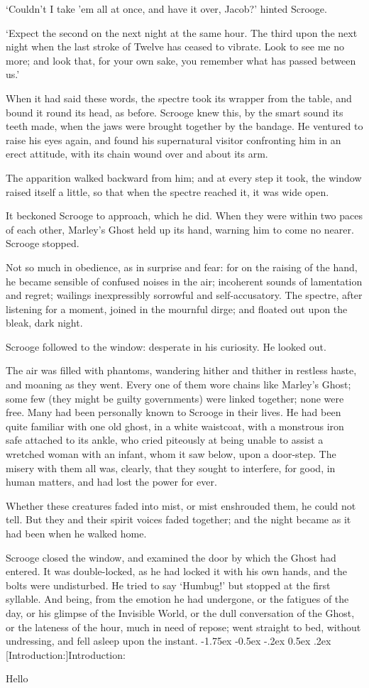 \documentclass[11pt,twoside]{article}\makeatletter
\makeatletter
\renewcommand\section{\@startsection {section}{1}{\z@}%
     {-1.75ex \@plus -0.5ex \@minus -.2ex}%
     {0.5ex \@plus .2ex}%
     {\reset@font\Large\bfseries\sffamily}}
\renewcommand\subsection{\@startsection{subsection}{2}{\z@}%
     {-1.75ex\@plus -0.5ex \@minus- .2ex}%
     {0.5ex \@plus .2ex}%
     {\reset@font\Large\sffamily}}
\def\DivII{\subsection}
\def\DivII{\section}
\makeatother
\begin{document}
‘Couldn't I take 'em all at once, and have it over, Jacob?’ hinted Scrooge.  \par
‘Expect the second on the next night at the same hour. The third upon the next night when the last stroke of Twelve has ceased to vibrate.  Look to see me no more; and look that, for your own sake, you remember what has passed between us.’\par
When it had said these words, the spectre took its wrapper from the table, and bound it round its head, as before. Scrooge knew this, by the smart sound its teeth made, when the jaws were brought together by the bandage.  He ventured to raise his eyes again, and found his supernatural visitor confronting him in an erect attitude, with its chain wound over and about its arm.  \par
The apparition walked backward from him; and at every step it took, the window raised itself a little, so that when the spectre reached it, it was wide open.  \par
It beckoned Scrooge to approach, which he did.  When they were within two paces of each other, Marley's Ghost held up its hand, warning him to come no nearer.  Scrooge stopped.  \par
Not so much in obedience, as in surprise and fear: for on the raising of the hand, he became sensible of confused noises in the air; incoherent sounds of lamentation and regret; wailings inexpressibly sorrowful and self-accusatory.  The spectre, after listening for a moment, joined in the mournful dirge; and floated out upon the bleak, dark night.   \par
Scrooge followed to the window: desperate in his curiosity.  He looked out.  \par
The air was filled with phantoms, wandering hither and thither in restless haste, and moaning as they went. Every one of them wore chains like Marley's Ghost; some few (they might be guilty governments) were linked together; none were free. Many had been personally known to Scrooge in their lives. He had been quite familiar with one old ghost, in a white waistcoat, with a monstrous iron safe attached to its ankle, who cried piteously at being unable to assist a wretched woman with an  infant, whom it saw below, upon a door-step. The misery with them all was, clearly, that they sought to interfere, for good, in human matters, and had lost the power for ever.  \par
Whether these creatures faded into mist, or mist enshrouded them, he could not tell.  But they and their spirit voices faded together; and the night became as it had been when he walked home.  \par
Scrooge closed the window, and examined the door by which the Ghost had entered.  It was double-locked, as he had locked it with his own hands, and the bolts were undisturbed. He tried to say ‘Humbug!’ but stopped at the first syllable.  And being, from the emotion he had undergone, or the fatigues of the day, or his glimpse of the Invisible World, or the dull conversation of the Ghost, or the lateness of the hour, much in need of repose; went straight to bed, without undressing, and fell asleep upon the instant. 
\DivII[Introduction:]{Introduction:}\par
Hello
\end{document}
